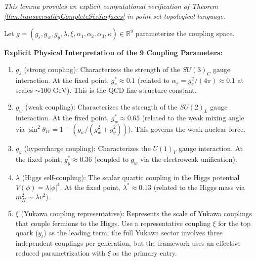 
\begin{lemma}
\label{lem:transversalityVerificationJacobian}

\textit{This lemma provides an explicit computational verification of Theorem \ref{thm:transversalityCompleteSixSurfaces} in point-set topological language.}

Let $g = (g_s, g_w, g_y, \lambda, \xi, \alpha_1, \alpha_2, \alpha_3, \kappa) \in \mathbb{R}^9$ parameterize the coupling space. 

\textbf{Explicit Physical Interpretation of the 9 Coupling Parameters:}

\begin{enumerate}

\item $g_s$ (strong coupling): Characterizes the strength of the $SU(3)_C$ gauge interaction. At the fixed point, $g_s^* \approx 0.1$ (related to $\alpha_s = g_s^2/(4\pi) \approx 0.1$ at scales $\sim 100 \text{ GeV}$). This is the QCD fine-structure constant.

\item $g_w$ (weak coupling): Characterizes the strength of the $SU(2)_L$ gauge interaction. At the fixed point, $g_w^* \approx 0.65$ (related to the weak mixing angle via $\sin^2\theta_W = 1 - (g_w/(g_w^2 + g_y^2))$). This governs the weak nuclear force.

\item $g_y$ (hypercharge coupling): Characterizes the $U(1)_Y$ gauge interaction. At the fixed point, $g_y^* \approx 0.36$ (coupled to $g_w$ via the electroweak unification).

\item $\lambda$ (Higgs self-coupling): The scalar quartic coupling in the Higgs potential $V(\phi) = \lambda |\phi|^4$. At the fixed point, $\lambda^* \approx 0.13$ (related to the Higgs mass via $m_H^2 \sim \lambda v^2$).

\item $\xi$ (Yukawa coupling representative): Represents the scale of Yukawa couplings that couple fermions to the Higgs. Use a representative coupling $\xi$ for the top quark ($y_t$) as the leading term; the full Yukawa sector involves three independent couplings per generation, but the framework uses an effective reduced parametrization with $\xi$ as the primary entry.


\end{enumerate}
\end{lemma}
